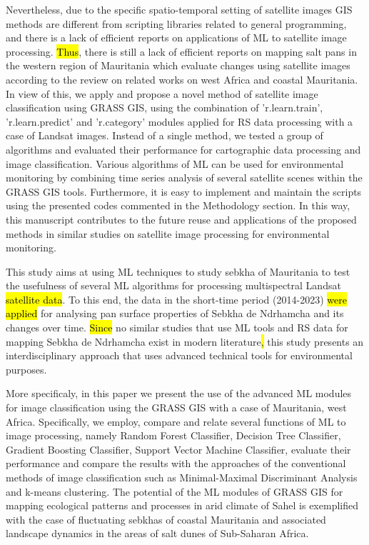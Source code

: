 \documentclass[12pt,a4paper,oneside]{article}
\def \newpar{\vspace{6pt}}
\begin{document}
\newpar Nevertheless, due to the specific spatio-temporal setting of satellite images GIS methods are different from scripting libraries related to general programming, and there is a lack of efficient reports on applications of ML to satellite image processing. \hl{Thus}, there is still a lack of efficient reports on mapping salt pans in the western region of Mauritania which evaluate changes using satellite images according to the review on related works on west Africa and coastal Mauritania. In view of this, we apply and propose a novel method of satellite image classification using GRASS GIS, using the combination of 'r.learn.train', 'r.learn.predict' and 'r.category' modules applied for RS data processing with a case of Landsat images. Instead of a single method, we tested a group of algorithms and evaluated their performance for cartographic data processing and image classification. Various algorithms of ML can be used for environmental monitoring by combining time series analysis of several satellite scenes within the GRASS GIS tools. Furthermore, it is easy to implement and maintain the scripts using the presented codes commented in the Methodology section. In this way, this manuscript contributes to the future reuse and applications of the proposed methods in similar studies on satellite image processing for environmental monitoring.

\newpar This study aims at using ML techniques to study sebkha of Mauritania to test the usefulness of several ML algorithms for processing multispectral Landsat \hl{satellite data}. To this end, the data in the short-time period (2014-2023) \hl{were applied }for analysing\hl{ }pan surface properties of Sebkha de Ndrhamcha and its changes over time. \hl{Since} no similar studies that use ML tools and RS data for mapping Sebkha de Ndrhamcha exist in modern literature\hl{, }this study presents an interdisciplinary approach that uses advanced technical tools for environmental purposes.

\newpar More specificaly, in this paper we present the use of the advanced ML modules for image classification using the GRASS GIS \citep{GRASS_GIS_software} with a case of Mauritania, west Africa. Specifically, we employ, compare and relate several functions of ML to image processing, namely Random Forest Classifier, Decision Tree Classifier, Gradient Boosting Classifier, Support Vector Machine Classifier, evaluate their performance and compare the results with the approaches of the conventional methods of image classification such as Minimal-Maximal Discriminant Analysis and k-means clustering. The potential of the ML modules of GRASS GIS \citep{NetelerMitasova2002} for mapping ecological patterns and processes in arid climate of Sahel is exemplified with the case of fluctuating sebkhas of coastal Mauritania and associated landscape dynamics in the areas of salt dunes of Sub-Saharan Africa.
\end{document}
